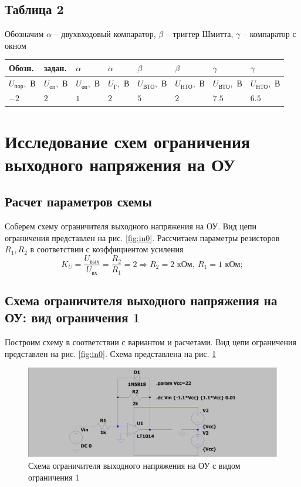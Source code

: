 \documentclass[a4paper, 12pt]{article}
\begin{document}
    \subsection{Таблица 2}
    Обозначим $\alpha$ -- двухвходовый компаратор, $\beta$ -- триггер Шмитта, $\gamma$ -- компаратор с окном
    \begin{center}
        \begin{tabular}{ | m{3.2em} | m{3em}| m{3em} | m{3em} | m{3.7em} | m{3.7em}| m{3.7em} | m{3.7em} |}
        \hline
        Обозн.& задан.& $\alpha$& $\alpha$& $\beta$& $\beta$& $\gamma$& $\gamma$\\ 
        \hline
        $U_{\text{пор}},$ В&$U_\text{оп},$ В& $U_\text{оп},$ В &$U_\text{Г},$ В&$U_\text{ВТО},$ В &$U_\text{НТО},$ В &$U_\text{ВТО},$ В &$U_\text{НТО},$ В\\ 
        \hline
        $-2$& $2$ & $1$ &$2$ &$5$ &$2$ &$7.5$ &$6.5$\\ 
        \hline
        \end{tabular}
    \end{center}


    \section{Исследование схем ограничения выходного напряжения на ОУ}
    \subsection{Расчет параметров схемы}
    Соберем схему ограничителя выходного напряжения на ОУ. Вид цепи ограничения представлен на рис. \ref{fig:in0}.
    Рассчитаем параметры резисторов $R_1,R_2$ в соответствии с коэффициентом усиления
    $$
    K_U=\dfrac{U_\text{вых}}{U_\text{вх}}=\dfrac{R_2}{R_1}=2\Rightarrow R_2=2\text{ кОм},\ R_1=1\text{ кОм};
    $$


    \subsection{Схема ограничителя выходного напряжения на ОУ: вид ограничения 1}
    Построим схему в соответствии с вариантом и расчетами. Вид цепи ограничения представлен на рис. \ref{fig:in0}.
    Схема представлена на рис. \ref{fig:scheme1}
    \begin{figure}[H]
        \centering
        \includegraphics[scale=0.22]{scheme1.png}
        \captionsetup{skip=0pt}
        \caption{Схема ограничителя выходного напряжения на ОУ с видом ограничения 1}
        \label{fig:scheme1}
    \end{figure}
\end{document}

